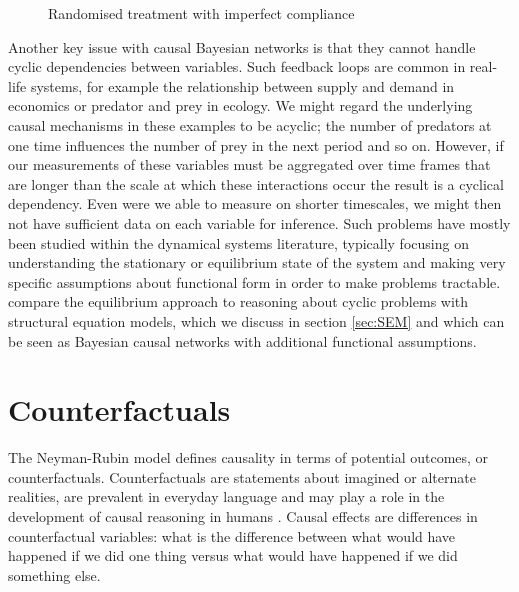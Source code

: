 \documentclass[11pt,a4paper,oneside]{book}
\theoremstyle{plain}
\theoremstyle{definition}
\begin{document}
\begin{figure}[h]
\centering
{}
\caption{Randomised treatment with imperfect compliance}
\label{fig:randomized_imperfect_compliance}
\end{figure}

Another key issue with causal Bayesian networks is that they cannot handle cyclic dependencies between variables. Such feedback loops are common in real-life systems, for example the relationship between supply and demand in economics or predator and prey in ecology. We might regard the underlying causal mechanisms in these examples to be acyclic; the number of predators at one time influences the number of prey in the next period and so on. However, if our measurements of these variables must be aggregated over time frames that are longer than the scale at which these interactions occur the result is a cyclical dependency. Even were we able to measure on shorter timescales, we might then not have sufficient data on each variable for inference. Such problems have mostly been studied within the dynamical systems literature, typically focusing on understanding the stationary or equilibrium state of the system and making very specific assumptions about functional form in order to make problems tractable. \citet{Poole2013} compare the equilibrium approach to reasoning about cyclic problems with structural equation models, which we discuss in section \ref{sec:SEM} and which can be seen as Bayesian causal networks with additional functional assumptions. 

\section{Counterfactuals}
\label{sec:counterfactuals}

The Neyman-Rubin model \citep{Rubin1974,Rubin1978,Rosenbaum1983, Rubin2005,Rubin2008} defines causality in terms of potential outcomes, or counterfactuals. Counterfactuals are statements about imagined or alternate realities, are prevalent in everyday language and may play a role in the development of causal reasoning in humans \citep{Weisberg2013}. Causal effects are differences in counterfactual variables: what is the difference between what would have happened if we did one thing versus what would have happened if we did something else. 
\end{document}
